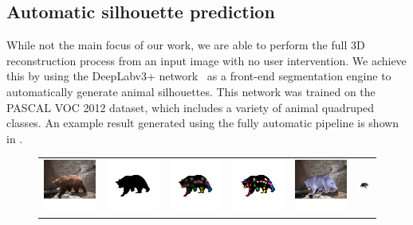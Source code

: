   \subsection{Automatic silhouette prediction}
  While not the main focus of our work, we are able to perform the full 3D reconstruction process from an input image with no user intervention. We achieve this by using the DeepLabv3+ network~\cite{deeplabv3plus} as a front-end segmentation engine to automatically generate animal silhouettes. This network was trained on the PASCAL VOC 2012 dataset, which includes a variety of animal quadruped classes. An example result generated using the fully automatic pipeline is shown in .
  
  \clearpage
  
  \begin{figure}[h!]
  \def\bb{\rule{2in}{0pt}\rule{0pt}{1in}}
  \def\lp#1[#2]#3{\parbox{0.16\linewidth}{\labelledpic{#1}{\texttt{[image: \#3]}}}}
  \begin{tabular}{cccccc}
  \includegraphics[trim={0 2cm 0 1.25cm},clip,width=0.16\linewidth]{res_bear_new/rgb.jpg} & 
  \includegraphics[trim={0 2cm 0 1.25cm},clip,width=0.16\linewidth]{res_bear_new/target.jpg} & 
  \includegraphics[trim={0 2cm 0 1.25cm},clip,width=0.16\linewidth]{res_bear_new/heatmap.jpg} & 
  \includegraphics[trim={0 2cm 0 1.25cm},clip,width=0.16\linewidth]{res_bear_new/cleaned_skeleton_sil.jpg} &
  \includegraphics[trim={0 2cm 0 1.25cm},clip,width=0.16\linewidth]{res_bear_new/3d_fit_overlay_rgb.jpg} & 
  \includegraphics[trim={0 2cm 0 1.25cm},clip,width=0.16\linewidth]{res_bear_new/3d_fit_reversed.jpg} \\
  

\end{tabular}
\end{figure}
